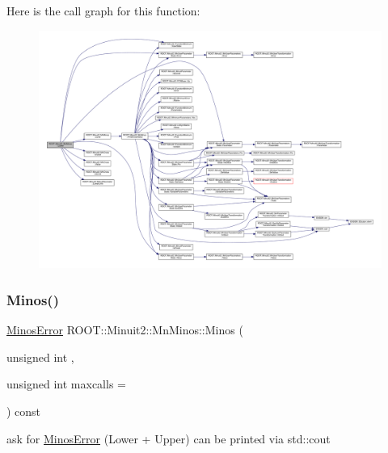 Here is the call graph for this function\+:
\nopagebreak
\begin{figure}[H]
\begin{center}
\leavevmode
\includegraphics[width=350pt]{dc/d91/classROOT_1_1Minuit2_1_1MnMinos_a0e6c6ab67bdd7b3461d900f64b4908ba_cgraph}
\end{center}
\end{figure}
\mbox{\label{classROOT_1_1Minuit2_1_1MnMinos_aeb1fe39f5851b5af050191d812d21723}} 
\subsubsection{\texorpdfstring{Minos()}{Minos()}\hspace{0.1cm}{\footnotesize\ttfamily [1/3]}}
{\footnotesize\ttfamily \mbox{\hyperlink{classROOT_1_1Minuit2_1_1MinosError}{Minos\+Error}} R\+O\+O\+T\+::\+Minuit2\+::\+Mn\+Minos\+::\+Minos (\begin{DoxyParamCaption}\item[{unsigned int}]{,  }\item[{unsigned int}]{maxcalls = {} }\end{DoxyParamCaption}) const}

ask for \mbox{\hyperlink{classROOT_1_1Minuit2_1_1MinosError}{Minos\+Error}} (Lower + Upper) can be printed via std\+::cout \mbox{\label{classROOT_1_1Minuit2_1_1MnMinos_aeb1fe39f5851b5af050191d812d21723}} 
